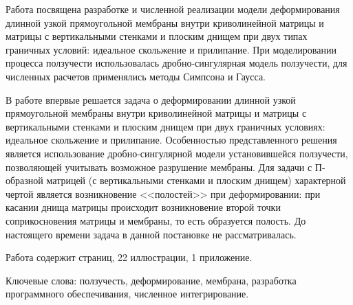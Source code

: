 Работа посвящена разработке и численной реализации модели деформирования длинной узкой 
прямоугольной мембраны внутри криволинейной матрицы и матрицы с вертикальными стенками и плоским днищем
при двух типах граничных условий: идеальное скольжение и прилипание.
При моделировании процесса ползучести использовалась дробно-сингулярная
модель ползучести, для численных расчетов применялись методы Симпсона и Гаусса.

В работе впервые решается задача о деформировании длинной узкой прямоугольной мембраны внутри криволинейной матрицы и матрицы с вертикальными стенками и плоским днищем при двух граничных условиях: идеальное скольжение и прилипание. Особенностью представленного решения является использование дробно-сингулярной модели установившейся ползучести, позволяющей учитывать возможное разрушение мембраны. Для задачи с П-образной матрицей 
(с вертикальными стенками и плоским днищем) характерной чертой является возникновение <<полостей>> при деформировании: при касании днища матрицы
происходит возникновение второй точки соприкосновения матрицы и мембраны, то есть образуется полость. До настоящего времени задача в данной постановке не рассматривалась.

Работа содержит \pageref{LastPage} страниц, 22 иллюстрации, 1 приложение.



Ключевые слова: ползучесть, деформирование, мембрана, разработка программного обеспечивания, численное интегрирование.
\newpage